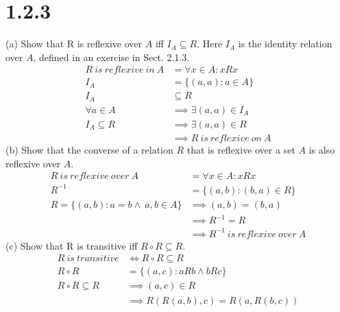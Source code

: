 \documentclass{article}
\begin{document}
\section*{1.2.3}
(a) Show that R is reflexive over $A$ iff $I_A \subseteq R$. Here $I_A$ is the identity relation over $A$, defined in an exercise in Sect. 2.1.3.
\begin{align*}
    R\ is\ reflexive\ in\ A &= \forall x \in A: xRx\\
    I_A &= \{(a,a): a \in A\}\\
    I_A &\subseteq R\\
    \forall a \in A &\implies \exists (a, a) \in I_A\\
    I_A \subseteq R &\implies \exists(a,a) \in R\\
    &\implies R\ is\ reflexive\ on\ A
\end{align*}
(b) Show that the converse of a relation $R$ that is reflexive over a set $A$ is also reflexive over $A$.
\begin{align*}
    R\ is\ reflexive\ over\ A &= \forall x \in A: xRx\\
    R^{-1} &= \{(a, b): (b, a) \in R\}\\
    R = \{(a, b): a = b \wedge\ a, b \in A\} &\implies (a, b) = (b, a)\\
    &\implies R^{-1} = R\\
    &\implies R^{-1}\ is\ reflexive\ over\ A
\end{align*}
(c) Show that R is transitive iff $R \circ R \subseteq R$.
 \begin{align*}
     R\ is\ transitive &\iff R \circ R \subseteq R\\
     R \circ R &= \{(a, c): aRb \wedge bRc\}\\
     R \circ R \subseteq R &\implies (a, c) \in R\\
     &\implies R(R(a,b), c) = R(a, R(b, c))
 \end{align*}
\end{document}
